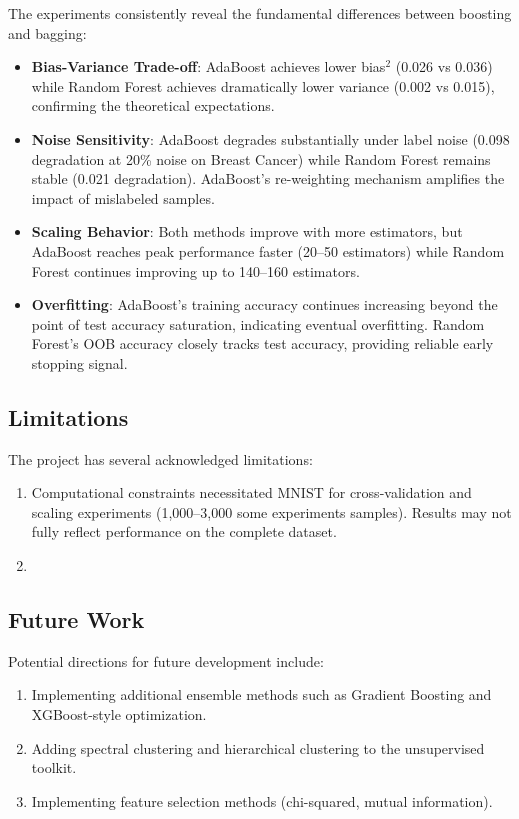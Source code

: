 \documentclass[conference,12pt]{IEEEtran}
\begin{document}
The experiments consistently reveal the fundamental differences between boosting and bagging:
\begin{itemize}
    \item \textbf{Bias-Variance Trade-off}: AdaBoost achieves lower bias$^2$ (0.026 vs 0.036) while Random Forest achieves dramatically lower variance (0.002 vs 0.015), confirming the theoretical expectations.
    \item \textbf{Noise Sensitivity}: AdaBoost degrades substantially under label noise (0.098 degradation at 20\% noise on Breast Cancer) while Random Forest remains stable (0.021 degradation). AdaBoost's re-weighting mechanism amplifies the impact of mislabeled samples.
    \item \textbf{Scaling Behavior}: Both methods improve with more estimators, but AdaBoost reaches peak performance faster (20--50 estimators) while Random Forest continues improving up to 140--160 estimators.
    \item \textbf{Overfitting}: AdaBoost's training accuracy continues increasing beyond the point of test accuracy saturation, indicating eventual overfitting. Random Forest's OOB accuracy closely tracks test accuracy, providing reliable early stopping signal.
\end{itemize}

\subsection{Limitations}

The project has several acknowledged limitations:
\begin{enumerate}
    \item Computational constraints necessitated MNIST for cross-validation and scaling experiments (1,000--3,000 some experiments samples). Results may not fully reflect performance on the complete dataset.
    \item 
\end{enumerate}

\subsection{Future Work}

Potential directions for future development include:
\begin{enumerate}
    \item Implementing additional ensemble methods such as Gradient Boosting and XGBoost-style optimization.
    \item Adding spectral clustering and hierarchical clustering to the unsupervised toolkit.
    \item Implementing feature selection methods (chi-squared, mutual information).
\end{enumerate}
\end{document}
